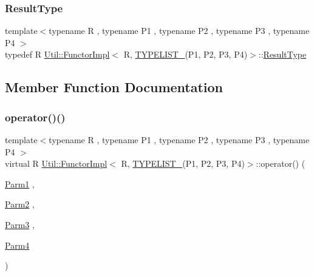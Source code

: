 \subsubsection{\texorpdfstring{ResultType}{ResultType}\hspace{0.1cm}{\footnotesize\ttfamily [3/3]}}
{\footnotesize\ttfamily template$<$typename R , typename P1 , typename P2 , typename P3 , typename P4 $>$ \\
typedef R \mbox{\hyperlink{classUtil_1_1FunctorImpl}{Util\+::\+Functor\+Impl}}$<$ R, \mbox{\hyperlink{adat__devel__install_2include_2adat_2typelist_8h_a7a156c571ab21a16b0495e1c882a07fa}{T\+Y\+P\+E\+L\+I\+S\+T\+\_}}(P1, P2, P3, P4)$>$\+::\mbox{\hyperlink{structUtil_1_1Private_1_1FunctorImplBase_a5e95fd30fdd89f3c5080b68ab5891bc3}{Result\+Type}}}



\subsection{Member Function Documentation}
\mbox{\label{classUtil_1_1FunctorImpl_3_01R_00_01TYPELIST__4_07P1_00_01P2_00_01P3_00_01P4_08_4_ad5c77ea15e9101b061099c9caaeba2be}} 
\subsubsection{\texorpdfstring{operator()()}{operator()()}\hspace{0.1cm}{\footnotesize\ttfamily [1/3]}}
{\footnotesize\ttfamily template$<$typename R , typename P1 , typename P2 , typename P3 , typename P4 $>$ \\
virtual R \mbox{\hyperlink{classUtil_1_1FunctorImpl}{Util\+::\+Functor\+Impl}}$<$ R, \mbox{\hyperlink{adat__devel__install_2include_2adat_2typelist_8h_a7a156c571ab21a16b0495e1c882a07fa}{T\+Y\+P\+E\+L\+I\+S\+T\+\_}}(P1, P2, P3, P4)$>$\+::operator() (\begin{DoxyParamCaption}\item[{\mbox{\hyperlink{structUtil_1_1Private_1_1FunctorImplBase_a9d61e693d6c616dea5bd9d9073c7d21a}{Parm1}}}]{,  }\item[{\mbox{\hyperlink{structUtil_1_1Private_1_1FunctorImplBase_a554085cd798ef14838a59b528f0feb2e}{Parm2}}}]{,  }\item[{\mbox{\hyperlink{structUtil_1_1Private_1_1FunctorImplBase_a052148e627fd4caecbcffdbdf1033dbb}{Parm3}}}]{,  }\item[{\mbox{\hyperlink{structUtil_1_1Private_1_1FunctorImplBase_a1ad7fe3f243480c44a610927ebe76762}{Parm4}}}]{ }\end{DoxyParamCaption})\hspace{0.3cm}{\ttfamily [pure virtual]}}

